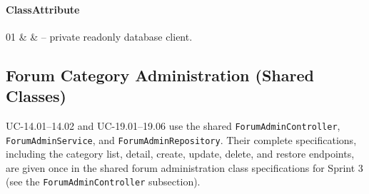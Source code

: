 \paragraph{ClassAttribute}
\begin{ClassAttributeTable}
01 &  &  -- private readonly database client. \\ \hline
\end{ClassAttributeTable}

\subsection{Forum Category Administration (Shared Classes)}

UC-14.01--14.02 and UC-19.01--19.06 use the shared
\texttt{ForumAdminController}, \texttt{ForumAdminService}, and
\texttt{ForumAdminRepository}. Their complete specifications, including the
category list, detail, create, update, delete, and restore endpoints, are
given once in the shared forum administration class specifications for
Sprint 3 (see the \texttt{ForumAdminController} subsection).
